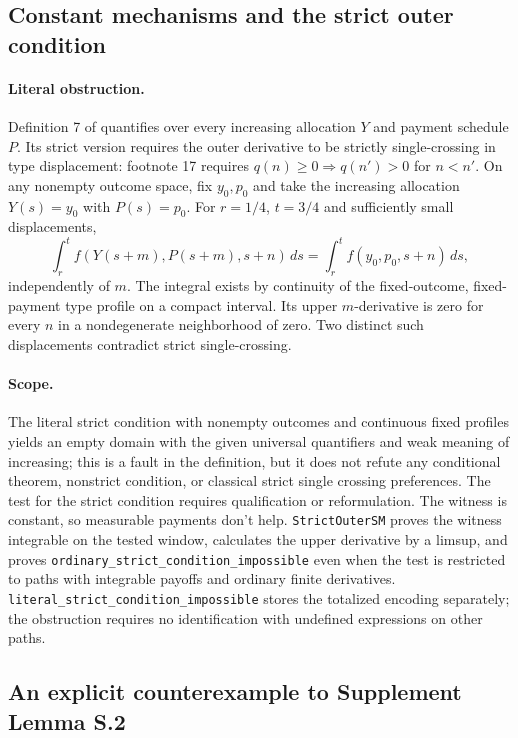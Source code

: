 \documentclass[11pt]{article}
\theoremstyle{remark}\newtheorem{remark}[theorem]{Remark}
\begin{document}
\subsection{Constant mechanisms and the strict outer condition}
\label{app:audit-strict-sm}

\paragraph{Literal obstruction.}
Definition 7 of \citet[Section 4.2]{Sinander2022} quantifies over every
increasing allocation $Y$ and payment schedule $P$.  Its strict version
requires the outer derivative to be strictly single-crossing in type
displacement: footnote 17 requires
$q(n)\ge0\Rightarrow q(n')>0$ for $n<n'$.
On any nonempty outcome space, fix $y_0,p_0$ and take the increasing
allocation $Y(s)=y_0$ with $P(s)=p_0$.  For $r=1/4$, $t=3/4$ and
sufficiently small displacements,
\[
 \int_r^t f(Y(s+m),P(s+m),s+n)\,ds
 =\int_r^t f(y_0,p_0,s+n)\,ds,
\]
independently of $m$.  The integral exists by continuity of the
fixed-outcome, fixed-payment type profile on a compact interval.
Its upper $m$-derivative is zero for every $n$ in a nondegenerate
neighborhood of zero.  Two distinct such displacements contradict
strict single-crossing.

\paragraph{Scope.}
The literal strict condition with nonempty outcomes and continuous fixed profiles yields an empty domain with the given universal quantifiers and weak meaning of increasing; this is a fault in the definition, but it does not refute any conditional theorem, nonstrict condition, or classical strict single crossing preferences.  The test for the strict condition requires qualification or reformulation.  The witness is constant, so measurable payments don't help.  \texttt{StrictOuterSM} proves the witness integrable on the tested window, calculates the upper derivative by a limsup, and proves \texttt{ordinary\_strict\_condition\_impossible} even when the test is restricted to paths with integrable payoffs and ordinary finite derivatives.  \texttt{literal\_strict\_condition\_impossible} stores the totalized encoding separately; the obstruction requires no identification with undefined expressions on other paths.

\subsection{An explicit counterexample to Supplement Lemma S.2}
\label{app:audit-dc-tests}
\end{document}
